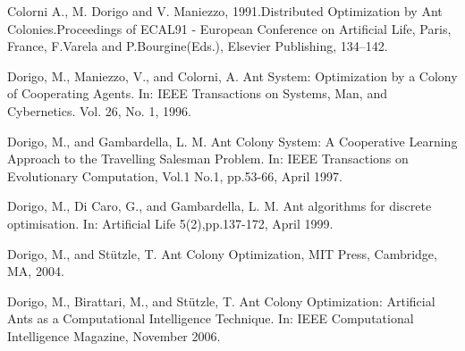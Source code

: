 \documentclass[10pt]{article}
\begin{document}
%
%
\newpage
\begin{thebibliography}{9}
 



Colorni   A.,   M.   Dorigo   and   V.   Maniezzo,   1991.Distributed   Optimization   by   Ant   Colonies.Proceedings  of  ECAL91  -  European  Conference  on Artificial Life, Paris, France, F.Varela and P.Bourgine(Eds.), Elsevier Publishing, 134–142.

Dorigo,  M.,  Maniezzo,  V.,  and  Colorni,  A.  Ant  System:  Optimization  by  a  Colony  of Cooperating Agents. In: IEEE Transactions on Systems, Man, and Cybernetics. Vol. 26, No. 1, 1996.

Dorigo,  M.,  and  Gambardella,  L.  M.  Ant  Colony  System:  A  Cooperative  Learning Approach  to  the  Travelling  Salesman  Problem.  In: IEEE  Transactions  on  Evolutionary Computation, Vol.1 No.1, pp.53-66, April 1997.

Dorigo, M., Di Caro, G., and Gambardella, L. M. Ant algorithms for discrete optimisation. In: Artificial Life 5(2),pp.137-172, April 1999. 

Dorigo, M., and Stützle, T. Ant Colony Optimization, MIT Press, Cambridge, MA, 2004.

Dorigo,  M.,  Birattari,  M.,  and  Stützle,  T.  Ant Colony  Optimization:  Artificial  Ants  as  a Computational   Intelligence   Technique.  In: IEEE  Computational  Intelligence  Magazine, November 2006.


\end{thebibliography}
\end{document}
